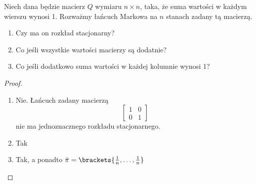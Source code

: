 \begin{exercise}
	Niech dana będzie macierz \( Q \) wymiaru \( n \times n \), taka, że suma wartości w każdym wierszu wynosi 1.
	Rozważmy łańcuch Markowa na \( n \) stanach zadany tą macierzą.

	\begin{enumerate}
		\item Czy ma on rozkład stacjonarny?
		\item Co jeśli wszystkie wartości macierzy są dodatnie?
		\item Co jeśli dodatkowo suma wartości w każdej kolumnie wynosi 1?
	\end{enumerate}
\end{exercise}
\begin{proof}
	\begin{enumerate}
		\item Nie.
		      Łańcuch zadany macierzą
		      \[
			      \begin{bmatrix}
				      1 & 0 \\
				      0 & 1
			      \end{bmatrix}
		      \]
		      nie ma jednoznacznego rozkładu stacjonarnego.

		\item Tak

		\item Tak, a ponadto \( \bar \pi = \brackets{\frac{1}{n}, \dots, \frac{1}{n}} \)
	\end{enumerate}
\end{proof}